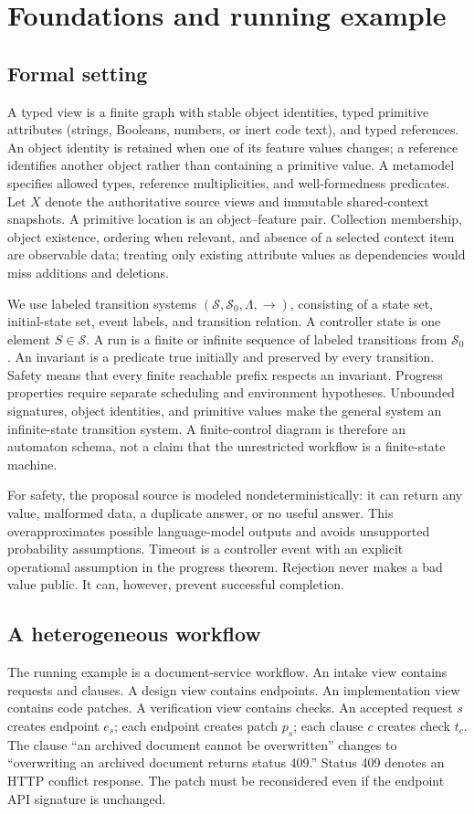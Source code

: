 \documentclass[pdflatex,sn-mathphys-num]{sn-jnl}
\theoremstyle{thmstyleone}
\theoremstyle{thmstylethree}
\theoremstyle{thmstyletwo}
\begin{document}
\section{Foundations and running example}\label{sec:found}
\subsection{Formal setting}
A typed view is a finite graph with stable object identities, typed primitive attributes (strings, Booleans, numbers, or inert code text), and typed references. An object identity is retained when one of its feature values changes; a reference identifies another object rather than containing a primitive value. A metamodel specifies allowed types, reference multiplicities, and well-formedness predicates. Let $X$ denote the authoritative source views and immutable shared-context snapshots. A primitive location is an object--feature pair. Collection membership, object existence, ordering when relevant, and absence of a selected context item are observable data; treating only existing attribute values as dependencies would miss additions and deletions.

We use labeled transition systems $(\mathcal S,\mathcal S_0,\Lambda,\longrightarrow)$, consisting of a state set, initial-state set, event labels, and transition relation. A controller state is one element $S\in\mathcal S$. A run is a finite or infinite sequence of labeled transitions from $\mathcal S_0$. An invariant is a predicate true initially and preserved by every transition. Safety means that every finite reachable prefix respects an invariant. Progress properties require separate scheduling and environment hypotheses. Unbounded signatures, object identities, and primitive values make the general system an infinite-state transition system. A finite-control diagram is therefore an automaton schema, not a claim that the unrestricted workflow is a finite-state machine.

For safety, the proposal source is modeled nondeterministically: it can return any value, malformed data, a duplicate answer, or no useful answer. This overapproximates possible language-model outputs and avoids unsupported probability assumptions. Timeout is a controller event with an explicit operational assumption in the progress theorem. Rejection never makes a bad value public. It can, however, prevent successful completion.

\subsection{A heterogeneous workflow}
The running example is a document-service workflow. An intake view contains requests and clauses. A design view contains endpoints. An implementation view contains code patches. A verification view contains checks. An accepted request $s$ creates endpoint $e_s$; each endpoint creates patch $p_s$; each clause $c$ creates check $t_c$. The clause ``an archived document cannot be overwritten'' changes to ``overwriting an archived document returns status 409.'' Status 409 denotes an HTTP conflict response. The patch must be reconsidered even if the endpoint API signature is unchanged.
\end{document}
